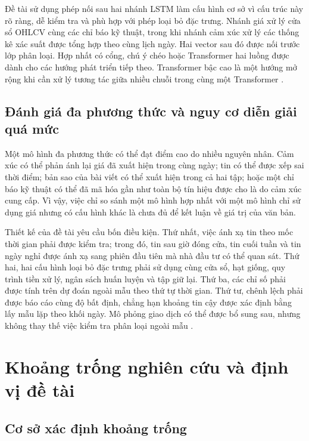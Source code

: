 \documentclass[12pt, a4paper, oneside]{report}
\begin{document}
Đề tài sử dụng phép nối sau hai nhánh LSTM làm cấu hình cơ sở vì cấu trúc này rõ ràng,
dễ kiểm tra và phù hợp với phép loại bỏ đặc trưng. Nhánh giá xử lý cửa sổ OHLCV cùng
các chỉ báo kỹ thuật, trong khi nhánh cảm xúc xử lý các thống kê xác suất được tổng hợp
theo cùng lịch ngày. Hai vector sau đó được nối trước lớp phân loại. Hợp nhất có cổng,
chú ý chéo hoặc Transformer hai luồng được dành cho các hướng phát triển tiếp theo.
Transformer bậc cao là một hướng mở rộng khi cần xử lý tương tác giữa nhiều chuỗi trong
cùng một Transformer \cite{Omranpour2024_241210540v1}.

\subsection{Đánh giá đa phương thức và nguy cơ diễn giải quá mức}

Một mô hình đa phương thức có thể đạt điểm cao do nhiều nguyên nhân. Cảm xúc có thể phản ánh lại giá đã xuất hiện trong cùng ngày; tin có thể được xếp sai thời
điểm; bản sao của bài viết có thể xuất hiện trong cả hai tập; hoặc một chỉ báo kỹ thuật
có thể đã mã hóa gần như toàn bộ tín hiệu được cho là do cảm xúc cung cấp. Vì vậy, việc
chỉ so sánh một mô hình hợp nhất với một mô hình chỉ sử dụng giá nhưng có cấu hình khác
là chưa đủ để kết luận về giá trị của văn bản.

Thiết kế của đề tài yêu cầu bốn điều kiện. Thứ nhất, việc ánh xạ tin theo mốc thời gian
phải được kiểm tra; trong đó, tin sau giờ đóng cửa, tin cuối tuần và tin ngày nghỉ được
ánh xạ sang phiên đầu tiên mà nhà đầu tư có thể quan sát. Thứ hai, hai cấu hình loại bỏ
đặc trưng phải sử dụng cùng cửa sổ, hạt giống, quy trình tiền xử lý, ngân sách huấn
luyện và tập giữ lại. Thứ ba, các chỉ số phải được tính trên dự đoán ngoài mẫu theo thứ
tự thời gian. Thứ tư, chênh lệch phải được báo cáo cùng độ bất định, chẳng hạn khoảng
tin cậy được xác định bằng lấy mẫu lặp theo khối ngày. Mô phỏng giao dịch có thể được
bổ sung sau, nhưng không thay thế việc kiểm tra phân loại ngoài mẫu
\cite{Chen2021_210708721v1,Feng2018_181009936v2}.
\section{Khoảng trống nghiên cứu và định vị đề tài}
\label{sec:tq-gap}

\subsection{Cơ sở xác định khoảng trống}
\end{document}
